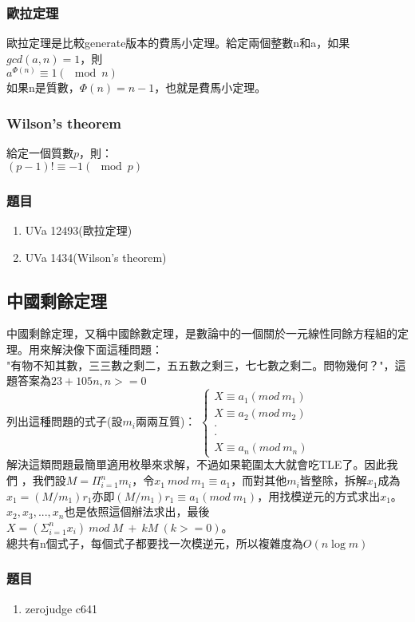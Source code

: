 \subsubsection{歐拉定理}
歐拉定理是比較generate版本的費馬小定理。給定兩個整數n和a，如果$gcd(a,n)=1$，則\\
$a^{\Phi(n)} \equiv 1 (\mod n)$\\
如果n是質數，$\Phi(n)=n-1$，也就是費馬小定理。
\subsubsection{Wilson's theorem}
給定一個質數$p$，則：\\
$(p-1)!\equiv -1 (\mod p)$
\subsubsection{題目}
\begin{enumerate}
\item UVa 12493(歐拉定理)
\item UVa 1434(Wilson's theorem)
\end{enumerate}
\subsection{中國剩餘定理}
中國剩餘定理，又稱中國餘數定理，是數論中的一個關於一元線性同餘方程組的定理。用來解決像下面這種問題：\\
"有物不知其數，三三數之剩二，五五數之剩三，七七數之剩二。問物幾何？"，這題答案為$23+105n,n>=0$\\
列出這種問題的式子(設$m_i$兩兩互質)：
$\left \{ \begin{matrix} X\equiv a_1 (mod\ m_1)\\ X\equiv a_2 (mod\ m_2)\\ \cdot \\ \cdot \\ X\equiv a_n (mod\ m_n)\end{matrix}\right.$\\
解決這類問題最簡單適用枚舉來求解，不過如果範圍太大就會吃TLE了。因此我們 ，我們設$M=\Pi_{i=1}^{n} m_i$，令$x_1\ mod\ m_1\equiv a_1$，而對其他$m_i$皆整除，拆解$x_1$成為$x_1=(M/m_1)r_1$亦即$(M/m_1)r_1\equiv a_1 (mod\ m_1)$，用找模逆元的方式求出$x_1$。$x_2,x_3,...,x_n$也是依照這個辦法求出，最後$X=(\Sigma_{i=1}^{n} x_i)\ mod\ M\ +\ kM\ (k>=0)$。\\
總共有n個式子，每個式子都要找一次模逆元，所以複雜度為$O(n \log m)$
\subsubsection{題目}
\begin{enumerate}
\item zerojudge c641
\end{enumerate}